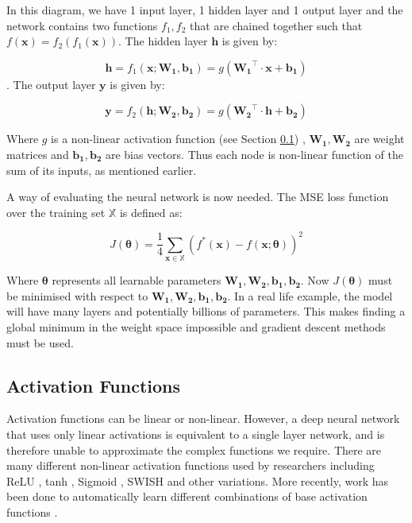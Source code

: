 In this diagram, we have 1 input layer, 1 hidden layer and 1 output layer and the network contains two functions $f_1, f_2$ that are chained together such that $f(\bm{x}) = f_2(f_1(\bm{x}))$.
The hidden layer $\bm{h}$ is given by:

\begin{equation}
    \bm{h} = f_1(\bm{x}; \bm{W_1}, \bm{b_1}) = g(\bm{W_1}^\top \cdot \bm{x} + \bm{b_1})
    \label{eq:hidden_layer}
\end{equation}
.
The output layer $\bm{y}$ is given by:

\begin{equation}
    \bm{y} = f_2(\bm{h}; \bm{W_2}, \bm{b_2}) = g(\bm{W_2}^\top \cdot \bm{h} + \bm{b_2})
    \label{eq:output_layer}
\end{equation}

Where $g$ is a non-linear activation function (see Section \ref{subsec:activation_function}) , $\bm{W_1}, \bm{W_2}$ are weight matrices and $\bm{b_1}, \bm{b_2}$ are bias vectors.
Thus each node is non-linear function of the sum of its inputs, as mentioned earlier.

A way of evaluating the neural network is now needed.
The MSE loss function over the training set $\mathbb{X}$ is defined as:

\begin{equation}
    J(\bm{\theta}) = \frac{1}{4} \sum_{\bm{x} \in \mathbb{X}} (f^*(\bm{x}) - f(\bm{x}; \bm{\theta}))^2
    \label{mse_loss_function}
\end{equation}

Where $\bm{\theta}$ represents all learnable parameters $\bm{W_1}, \bm{W_2}, \bm{b_1}, \bm{b_2}$.
Now $J(\bm{\theta})$ must be minimised with respect to $\bm{W_1}, \bm{W_2}, \bm{b_1}, \bm{b_2}$.
In a real life example, the model will have many layers and potentially billions of parameters.
This makes finding a global minimum in the weight space impossible and gradient descent methods must be used.

\subsection{Activation Functions}\label{subsec:activation_function}

Activation functions can be linear or non-linear.
However, a deep neural network that uses only linear activations is equivalent to a single layer network, and is therefore unable to approximate the complex functions we require.
There are many different non-linear activation functions used by researchers including ReLU \cite{Jarrett_Kavukcuoglu_Lecun}, tanh \cite{LeCun_Bottou_Orr_Muller_1998}, Sigmoid \cite{Han_Moraga_1995}, SWISH \cite{Ramachandran_Zoph_Le_2017} and other variations.
More recently, work has been done to automatically learn different combinations of base activation functions \cite{Manessi_Rozza_2018}.

